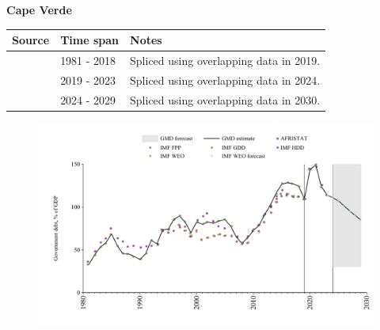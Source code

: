 \documentclass[12pt,a4paper,landscape]{article}
\begin{document}
\begin{adjustbox}{max totalsize={\paperwidth}{\paperheight},center}
\begin{minipage}[t][\textheight][t]{\textwidth}
\vspace*{0.5cm}
{}
\begin{center}
{\Large\bfseries Cape Verde}
\end{center}
\vspace{0.5cm}
\begin{table}[H]
\centering
\small
\begin{tabular}{|l|l|l|}
\hline
\textbf{Source} & \textbf{Time span} & \textbf{Notes} \\
\hline
\rowcolor{white}\cite{IMF_GDD}& 1981 - 2018 &Spliced using overlapping data in 2019.\\
\rowcolor{lightgray}\cite{IMF_FPP}& 2019 - 2023 &Spliced using overlapping data in 2024.\\
\rowcolor{white}\cite{IMF_WEO_forecast}& 2024 - 2029 &Spliced using overlapping data in 2030.\\
\hline
\end{tabular}
\end{table}
\begin{figure}[H]
\centering
\includegraphics[width=\textwidth,height=0.6\textheight,keepaspectratio]{graphs/CPV_govdebt_GDP.pdf}
\end{figure}
\end{minipage}
\end{adjustbox}
\end{document}
